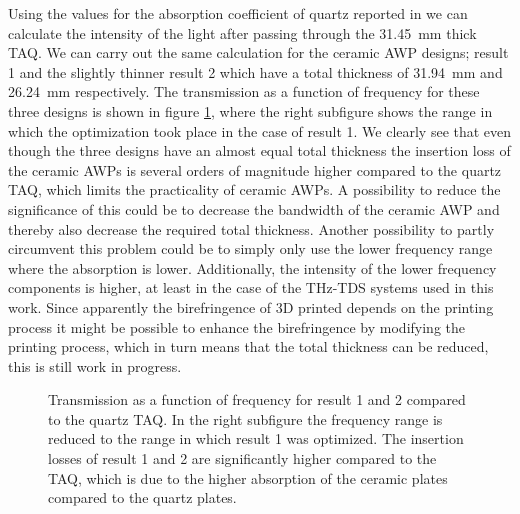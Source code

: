 Using the values for the absorption coefficient of quartz reported in \cite{DGrischkowsky1990} we can calculate the intensity of the light after passing through the \SI{31.45}{\milli \meter} thick TAQ. We can carry out the same calculation for the ceramic AWP designs; result 1 and the slightly thinner result 2 which have a total thickness of \SI{31.94}{\milli \meter} and \SI{26.24}{\milli \meter} respectively. The transmission as a function of frequency for these three designs is shown in figure \ref{fig:cl4_intensity}, where the right subfigure shows the range in which the optimization took place in the case of result 1. We clearly see that even though the three designs have an almost equal total thickness the insertion loss of the ceramic AWPs is several orders of magnitude higher compared to the quartz TAQ, which limits the practicality of ceramic AWPs.
A possibility to reduce the significance of this could be to decrease the bandwidth of the ceramic AWP and thereby also decrease the required total thickness. Another possibility to partly circumvent this problem could be to simply only use the lower frequency range where the absorption is lower. Additionally, the intensity of the lower frequency components is higher, at least in the case of the THz-TDS systems used in this work. Since apparently the birefringence of 3D printed  depends on the printing process it might be possible to enhance the birefringence by modifying the printing process, which in turn means that the total thickness can be reduced, this is still work in progress.

\begin{figure}[ht]
    \centering
    
    \caption{Transmission as a function of frequency for result 1 and 2 compared to the quartz TAQ. In the right subfigure the frequency range is reduced to the range in which result 1 was optimized. The insertion losses of result 1 and 2 are significantly higher compared to the TAQ, which is due to the higher absorption of the ceramic plates compared to the quartz plates.}
    \label{fig:cl4_intensity}
\end{figure}

